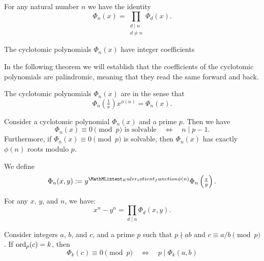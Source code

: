 \begin{theorem}
  For any natural number $n$ we have the identity
  \begin{equation*}
    \Phi_n(x)=\prod_{\substack{d\mid n\\[2pt]d\neq n}}\Phi_d(x).
  \end{equation*}
\end{theorem}

\begin{theorem}
  The cyclotomic polynomials $\Phi_n(x)$ have integer coefficients
\end{theorem}

In the following theorem we will establish that the coefficients of the cyclotomic polynomials are palindromic, meaning that they read the same forward and back. 

\begin{theorem}
  The cyclotomic polynomials $\Phi_n(x)$ are  in the sense that
  \begin{equation*}
    \Phi_n\left(\tfrac{1}{x}\right)x^{\phi(n)} = \Phi_n(x).
  \end{equation*}
\end{theorem}

\begin{theorem}
  Consider a cyclotomic polynomial $\Phi_n(x)$ and a prime $p$. Then we have
  \begin{equation*}
    \Phi_n(x)\equiv 0\pmod{p}\text{ is solvable}\quad\Leftrightarrow\quad n\mid p-1.
  \end{equation*}
  Furthermore, if $\Phi_n(x)\equiv 0\pmod{p}$ is solvable, then $\Phi_n(x)$ has exactly $\phi(n)$ roots modulo $p$.
\end{theorem}

\begin{definition}
  We define
  \begin{equation*}
    \Phi_n(x,y):= y^{\totient(n)}\Phi_n\left(\tfrac{x}{y}\right).
  \end{equation*}
\end{definition}

\begin{proposition}
  For any $x$, $y$, and $n$, we have:
  \begin{equation*}
    x^n-y^n=\prod_{d\mid n}\Phi_d(x,y).
  \end{equation*}
\end{proposition}

\begin{lemma}
  Consider integers $a$, $b$, and $c$, and a prime $p$ such that $p\nmid ab$ and $c\equiv a/b\pmod{p}$. If $\operatorname{ord}_p(c)=k$, then
  \begin{equation*}
    \Phi_k(c)\equiv 0\pmod{p} \quad\Leftrightarrow\quad p\mid \Phi_k(a,b)
  \end{equation*}
\end{lemma}

